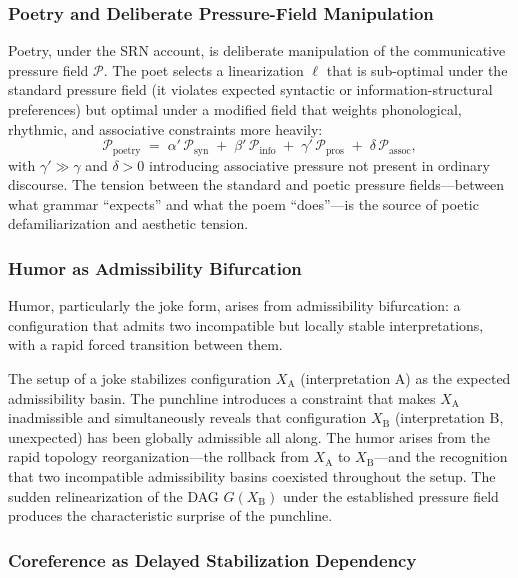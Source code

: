 \documentclass[11pt, a4paper]{article}
\theoremstyle{srn}
\theoremstyle{srnremark}
\begin{document}
\subsubsection*{Poetry and Deliberate Pressure-Field Manipulation}

Poetry, under the SRN account, is deliberate manipulation of the
communicative pressure field $\mathcal{P}$.
The poet selects a linearization $\ell$ that is sub-optimal under the
standard pressure field (it violates expected syntactic or
information-structural preferences) but optimal under a modified field
that weights phonological, rhythmic, and associative constraints more
heavily:
\[
  \mathcal{P}_{\mathrm{poetry}}
  \;=\;
  \alpha'\,\mathcal{P}_{\mathrm{syn}}
  \;+\; \beta'\,\mathcal{P}_{\mathrm{info}}
  \;+\; \gamma'\,\mathcal{P}_{\mathrm{pros}}
  \;+\; \delta\,\mathcal{P}_{\mathrm{assoc}},
\]
with $\gamma' \gg \gamma$ and $\delta > 0$ introducing associative
pressure not present in ordinary discourse.
The tension between the standard and poetic pressure fields---between
what grammar ``expects'' and what the poem ``does''---is the source
of poetic defamiliarization and aesthetic tension.

\subsubsection*{Humor as Admissibility Bifurcation}

Humor, particularly the joke form, arises from admissibility
bifurcation: a configuration that admits two incompatible but locally
stable interpretations, with a rapid forced transition between them.

The setup of a joke stabilizes configuration $X_{\mathrm{A}}$
(interpretation A) as the expected admissibility basin.
The punchline introduces a constraint that makes $X_{\mathrm{A}}$
inadmissible and simultaneously reveals that configuration
$X_{\mathrm{B}}$ (interpretation B, unexpected) has been globally
admissible all along.
The humor arises from the rapid topology reorganization---the
rollback from $X_{\mathrm{A}}$ to $X_{\mathrm{B}}$---and the
recognition that two incompatible admissibility basins coexisted
throughout the setup.
The sudden relinearization of the DAG $G(X_{\mathrm{B}})$ under the
established pressure field produces the characteristic surprise of the
punchline.

\subsubsection*{Coreference as Delayed Stabilization Dependency}
\end{document}
